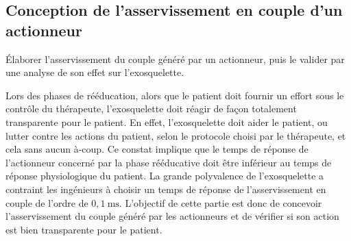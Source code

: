 \subsection{Conception de l'asservissement en couple d'un actionneur}
\begin{obj}
Élaborer l'asservissement du couple généré par un actionneur, puis le valider par une analyse de son effet sur l'exosquelette.
\end{obj}

\ifprof
\else
Lors des phases de rééducation, alors que le patient doit fournir un effort sous le contrôle du thérapeute, l'exosquelette doit réagir de façon totalement transparente pour le patient. En effet, l'exosquelette doit aider le patient, ou lutter contre les actions du patient, selon le protocole choisi par le thérapeute, et cela sans aucun à-coup. Ce constat implique que le temps de réponse de l'actionneur concerné par la phase rééducative doit être inférieur au temps de réponse physiologique du patient. La grande polyvalence de l'exosquelette a contraint les ingénieurs à choisir un temps de réponse de l'asservissement en couple de l'ordre de $0,1 \mathrm{~ms}$. L'objectif de cette partie est donc de concevoir l'asservissement du couple généré par les actionneurs et de vérifier si son action est bien transparente pour le patient.
\fi

